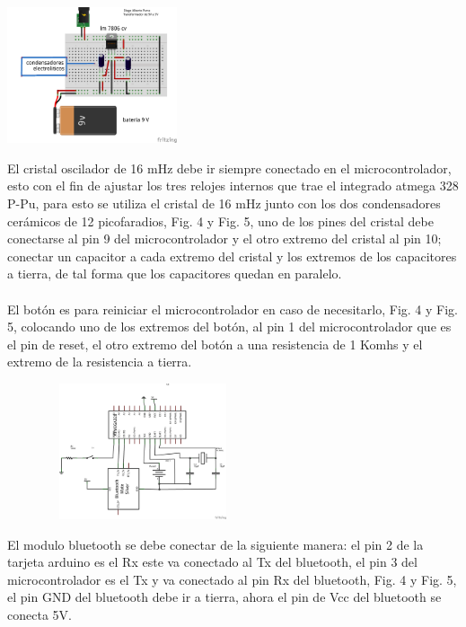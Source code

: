 \documentclass[12pt]{article}
\newenvironment{Figure}
{\par\medskip\noindent\minipage{\linewidth}}
{\endminipage\par\medskip}
\begin{document}
\begin{multicols}{2}
\begin{Figure}
\center
\includegraphics[width=7.cm, height=4cm]{fig/montajetr5V.png}
\label{fig:g3}
\end{Figure}

El cristal oscilador de 16 mHz debe ir siempre conectado en el microcontrolador, esto  con el fin de ajustar los tres relojes internos que trae el integrado atmega 328 P-Pu, para esto se utiliza el cristal de 16 mHz junto con los dos condensadores cerámicos de 12 picofaradios, Fig. 4 y Fig. 5,  uno de los pines del cristal debe conectarse al pin 9 del microcontrolador y el otro extremo del cristal al pin 10; conectar un capacitor a cada extremo del cristal y los extremos de los capacitores a tierra, de tal forma que los capacitores quedan en paralelo. 
\\ \\
El botón es para reiniciar el microcontrolador en caso de necesitarlo, Fig. 4 y Fig. 5, colocando uno de los extremos del botón, al pin 1 del microcontrolador que es el pin de reset, el otro extremo del botón a una resistencia de 1 Komhs y el extremo de la resistencia a tierra.

\begin{Figure}
\center
\includegraphics[width=8cm, height=4cm]{fig/bluetoothesq.png} 
\label{fig:g4}
\end{Figure}

El modulo bluetooth se debe conectar de la siguiente manera: el pin 2 de la tarjeta arduino es el Rx este va conectado al Tx del bluetooth, el pin 3 del microcontrolador es el Tx y va conectado al pin Rx del bluetooth, Fig. 4 y Fig. 5, el pin GND del bluetooth debe ir a tierra, ahora el pin de Vcc del bluetooth se conecta 5V. 


\end{multicols}
\end{document}
